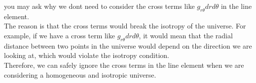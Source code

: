 \bigskip\noindent
\begin{foundation}
    you may ask why we dont need to consider the cross terms like $g_{r\theta} dr d\theta$ in the line element. \\

    The reason is that the cross terms would break the isotropy of the universe. For example, if we have a cross term like $g_{r\theta} dr d\theta$, it would mean that the radial distance between two points in the universe would depend on the direction we are looking at, which would violate the isotropy condition. \\
    
    Therefore, we can safely ignore the cross terms in the line element when we are considering a homogeneous and isotropic universe. 
\end{foundation}


